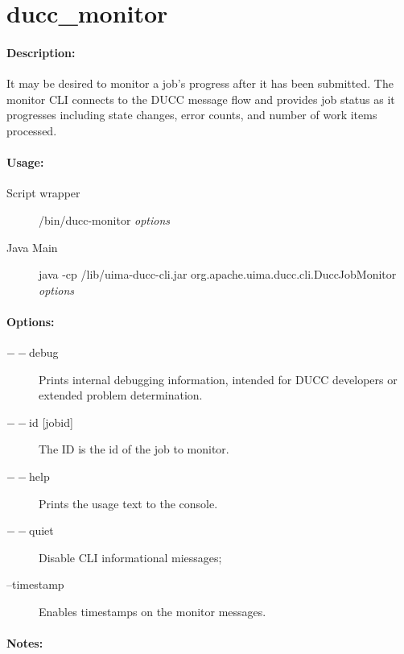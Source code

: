 
\ifpdf
\else
{}
\fi
    \section{ducc\_monitor}

    \paragraph{Description:}
    
    It may be desired to monitor a job's progress after it has been submitted. The monitor CLI 
    connects to the DUCC message flow and provides job status as it progresses including state 
    changes, error counts, and number of work items processed. 
    
    \paragraph{Usage:}
    \begin{description}
    \item[Script wrapper] \ducchome/bin/ducc-monitor {\em options}
    \item[Java Main]      java -cp \ducchome/lib/uima-ducc-cli.jar org.apache.uima.ducc.cli.DuccJobMonitor {\em options}
    \end{description}

    \paragraph{Options:}
    \begin{description}
        \item[$--$debug ]          
          Prints internal debugging information, intended for DUCC developers or extended problem determination.
        \item[$--$id {[jobid]}]
          The ID is the id of the job to monitor.
        \item[$--$help]
          Prints the usage text to the console. 
        \item[$--$quiet] 
          Disable CLI informational miessages;
        \item[--timestamp]
          Enables timestamps on the monitor messages.
     \end{description}
        
    \paragraph{Notes:}
